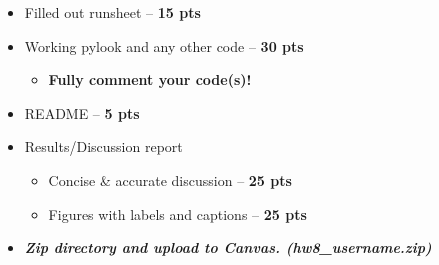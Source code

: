 \documentclass[10pt]{article}
\begin{document}
\begin{itemize}
	\item Filled out runsheet -- \textbf{15 pts}
	\item Working pylook and any other code -- \textbf{30 pts}
	\begin{itemize}
		\item \textbf{Fully comment your code(s)!} 
	\end{itemize}
	\item README -- \textbf{5 pts}
	\item Results/Discussion report 
	\begin{itemize}
		\item Concise \& accurate discussion -- \textbf{25 pts}
		\item Figures with labels and captions -- \textbf{25 pts}
	\end{itemize}
	\item \textbf{\textit{Zip directory and upload to Canvas. (hw8\_username.zip)}}
\end{itemize}
\end{document}
